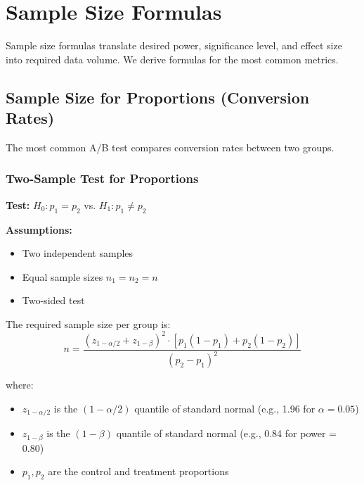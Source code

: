 \section{Sample Size Formulas}

Sample size formulas translate desired power, significance level, and effect size into required data volume. We derive formulas for the most common metrics.

\subsection{Sample Size for Proportions (Conversion Rates)}

The most common A/B test compares conversion rates between two groups.

\subsubsection{Two-Sample Test for Proportions}

\textbf{Test:} $H_0: p_1 = p_2$ vs. $H_1: p_1 \neq p_2$

\textbf{Assumptions:}
\begin{itemize}
    \item Two independent samples
    \item Equal sample sizes $n_1 = n_2 = n$
    \item Two-sided test
\end{itemize}

\begin{theorem}
The required sample size per group is:
\begin{equation}
n = \frac{(z_{1-\alpha/2} + z_{1-\beta})^2 \cdot [p_1(1-p_1) + p_2(1-p_2)]}{(p_2 - p_1)^2}
\end{equation}

where:
\begin{itemize}
    \item $z_{1-\alpha/2}$ is the $(1-\alpha/2)$ quantile of standard normal (e.g., 1.96 for $\alpha = 0.05$)
    \item $z_{1-\beta}$ is the $(1-\beta)$ quantile of standard normal (e.g., 0.84 for power = 0.80)
    \item $p_1, p_2$ are the control and treatment proportions
\end{itemize}
\end{theorem}

